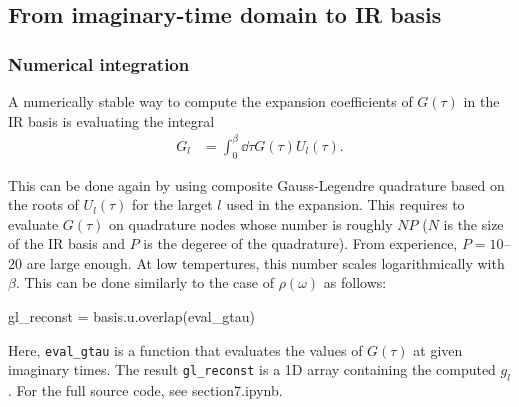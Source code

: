 \documentclass[submission, LectureNotes]{SciPost}
\begin{document}
\subsection{From imaginary-time domain to IR basis}
\subsubsection{Numerical integration}
A numerically stable way to compute the expansion coefficients of $G(\tau)$ in the IR basis
is evaluating the integral
\begin{align}
    G_l &= \int_0^\beta \dd \tau G(\tau) U_l(\tau).
\end{align}

This can be done again by using composite Gauss-Legendre quadrature
based on the roots of $U_l(\tau)$ for the larget $l$ used in the expansion.
This requires to evaluate $G(\tau)$ on quadrature nodes whose number is roughly 
$N P$ ($N$ is the size of the IR basis and $P$ is the degeree of the quadrature).
From experience, $P=10$--$20$ are large enough.
At low tempertures,
this number scales logarithmically with $\beta$.
This can be done similarly to the case of $\rho(\omega)$ as follows:
\begin{python}
gl_reconst = basis.u.overlap(eval_gtau)
\end{python}
Here, \texttt{eval\_gtau} is a function that evaluates the values of $G(\tau)$ at given imaginary times.
The result \texttt{gl\_reconst} is a 1D array containing the computed $g_l$.
For the full source code, see section7.ipynb.
\end{document}
